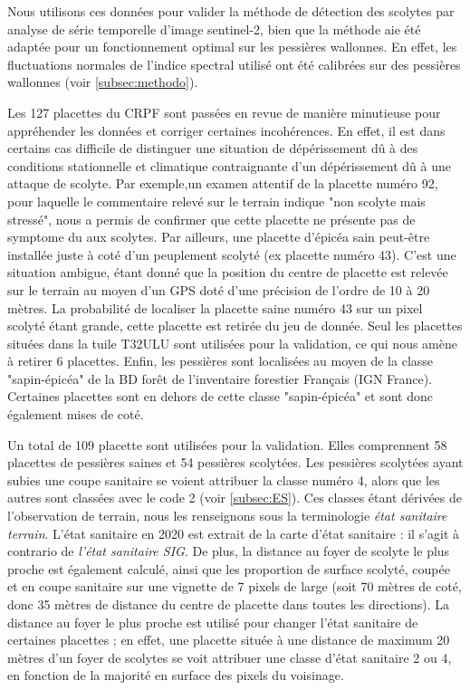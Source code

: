 \documentclass[a4paper, 12pt]{article} %
\begin{document}
Nous utilisons ces données pour valider la méthode de détection des scolytes par analyse de série temporelle d'image sentinel-2, bien que la méthode aie été adaptée pour un fonctionnement optimal sur les pessières wallonnes. En effet, les fluctuations normales de l'indice spectral utilisé ont été calibrées sur des pessières wallonnes (voir \ref{subsec:methodo}).

Les 127 placettes du CRPF sont passées en revue de manière minutieuse pour appréhender les données et corriger certaines incohérences. En effet, il est dans certains cas difficile de distinguer une situation de dépérissement dû à des conditions stationnelle et climatique contraignante d'un dépérissement dû à une attaque de scolyte. Par exemple,un examen attentif de la placette numéro 92, pour laquelle le commentaire relevé sur le terrain indique "non scolyte mais stressé", nous a permis de confirmer que cette placette ne présente pas de symptome du aux scolytes. Par ailleurs, une placette d'épicéa sain peut-être installée juste à coté d'un peuplement scolyté (ex placette numéro 43). C'est une situation ambigue, étant donné que la position du centre de placette est relevée sur le terrain au moyen d'un GPS doté d'une précision de l'ordre de 10 à 20 mètres. La probabilité de localiser la placette saine numéro 43 sur un pixel scolyté étant grande, cette placette est retirée du jeu de donnée. Seul les placettes situées dans la tuile T32ULU sont utilisées pour la validation, ce qui nous amène à retirer 6 placettes. Enfin, les pessières sont localisées au moyen de la classe "sapin-épicéa" de la BD forêt de l'inventaire forestier Français (IGN France). Certaines placettes sont en dehors de cette classe "sapin-épicéa" et sont donc également mises de coté.

Un total de 109 placette sont utilisées pour la validation. Elles comprennent 58 placettes de pessières saines et 54 pessières scolytées. Les pessières scolytées ayant subies une coupe sanitaire se voient attribuer la classe numéro 4, alors que les autres sont classées avec le code 2 (voir \ref{subsec:ES}). Ces classes étant dérivées de l'observation de terrain, nous les renseignons sous la terminologie \textit{état sanitaire terrain}. L'état sanitaire en 2020 est extrait de la carte d'état sanitaire : il s'agit à contrario de \textit{l'état sanitaire SIG}. De plus, la distance au foyer de scolyte le plus proche est également calculé, ainsi que les proportion de surface scolyté, coupée et en coupe sanitaire sur une vignette de 7 pixels de large (soit 70 mètres de coté, donc 35 mètres de distance du centre de placette dans toutes les directions). La distance au foyer le plus proche est utilisé pour changer l'état sanitaire de certaines placettes ; en effet, une placette située à une distance de maximum 20 mètres d'un foyer de scolytes se voit attribuer une classe d'état sanitaire 2 ou 4, en fonction de la majorité en surface des pixels du voisinage.
\end{document}
